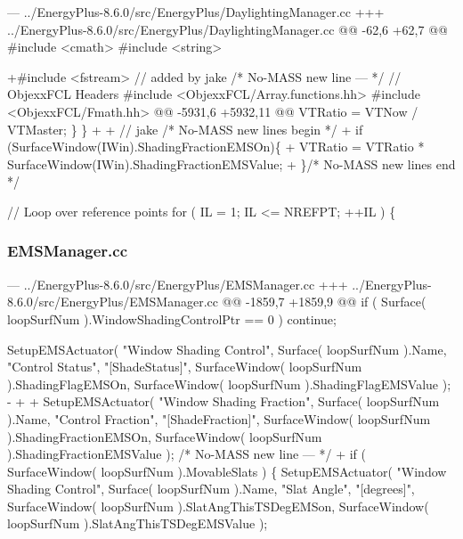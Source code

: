 \begin{DoxyCode}
--- ../EnergyPlus-8.6.0/src/EnergyPlus/DaylightingManager.cc
+++ ../EnergyPlus-8.6.0/src/EnergyPlus/DaylightingManager.cc
@@ -62,6 +62,7 @@
 #include <cmath>
 #include <string>

+#include <fstream> // added by jake /* No-MASS new line --- */
 // ObjexxFCL Headers
 #include <ObjexxFCL/Array.functions.hh>
 #include <ObjexxFCL/Fmath.hh>
@@ -5931,6 +5932,11 @@
                    VTRatio = VTNow / VTMaster;
                \}
            \}
+
+           // jake /* No-MASS new lines begin */
+           if (SurfaceWindow(IWin).ShadingFractionEMSOn)\{
+               VTRatio = VTRatio * SurfaceWindow(IWin).ShadingFractionEMSValue;
+           \}/* No-MASS new lines end */

            // Loop over reference points
            for ( IL = 1; IL <= NREFPT; ++IL ) \{
\end{DoxyCode}




 

\subsubsection*{E\+M\+S\+Manager.\+cc}




\begin{DoxyCode}
--- ../EnergyPlus-8.6.0/src/EnergyPlus/EMSManager.cc
+++ ../EnergyPlus-8.6.0/src/EnergyPlus/EMSManager.cc
@@ -1859,7 +1859,9 @@
            if ( Surface( loopSurfNum ).WindowShadingControlPtr == 0 ) continue;

            SetupEMSActuator( "Window Shading Control", Surface( loopSurfNum ).Name, "Control Status",
       "[ShadeStatus]", SurfaceWindow( loopSurfNum ).ShadingFlagEMSOn, SurfaceWindow( loopSurfNum ).ShadingFlagEMSValue
       );
-
+           
+           SetupEMSActuator( "Window Shading Fraction", Surface( loopSurfNum ).Name, "Control Fraction",
       "[ShadeFraction]", SurfaceWindow( loopSurfNum ).ShadingFractionEMSOn, SurfaceWindow( loopSurfNum
       ).ShadingFractionEMSValue ); /* No-MASS new line --- */
+           
            if ( SurfaceWindow( loopSurfNum ).MovableSlats ) \{
                SetupEMSActuator( "Window Shading Control", Surface( loopSurfNum ).Name, "Slat Angle",
       "[degrees]", SurfaceWindow( loopSurfNum ).SlatAngThisTSDegEMSon, SurfaceWindow( loopSurfNum
       ).SlatAngThisTSDegEMSValue );
\end{DoxyCode}




